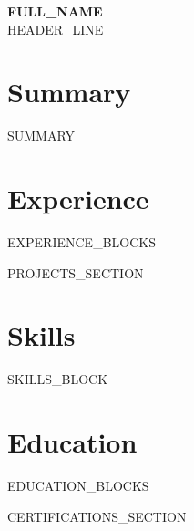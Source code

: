 \documentclass[11pt,letterpaper]{article}
\begin{document}
\begin{center}
{\LARGE \textbf{ {{FULL_NAME}} } } \\[2pt]
{{HEADER_LINE}}
\end{center}

\section*{Summary}
{{SUMMARY}}

\section*{Experience}
{{EXPERIENCE_BLOCKS}}

{{PROJECTS_SECTION}}

\section*{Skills}
{{SKILLS_BLOCK}}

\section*{Education}
{{EDUCATION_BLOCKS}}

{{CERTIFICATIONS_SECTION}}
\end{document}
